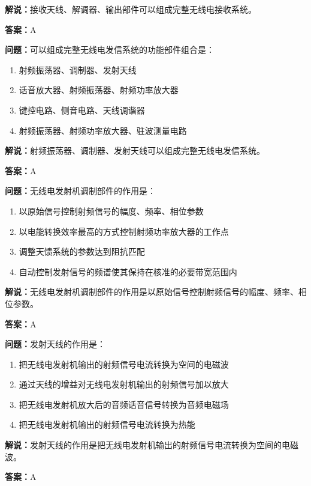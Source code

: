 \documentclass[UTF8]{ctexbook}
\begin{document}
\textbf{解说：}接收天线、解调器、输出部件可以组成完整无线电接收系统。%

\textbf{答案：}A

\textbf{问题：}可以组成完整无线电发信系统的功能部件组合是：

\begin{enumerate}[label=\Alph*), leftmargin=3em]
  \item 射频振荡器、调制器、发射天线
  \item 话音放大器、射频振荡器、射频功率放大器
  \item 键控电路、侧音电路、天线调谐器
  \item 射频振荡器、射频功率放大器、驻波测量电路
\end{enumerate}

\textbf{解说：}射频振荡器、调制器、发射天线可以组成完整无线电发信系统。%

\textbf{答案：}A

\textbf{问题：}无线电发射机调制部件的作用是：

\begin{enumerate}[label=\Alph*), leftmargin=3em]
  \item 以原始信号控制射频信号的幅度、频率、相位参数
  \item 以电能转换效率最高的方式控制射频功率放大器的工作点
  \item 调整天馈系统的参数达到阻抗匹配
  \item 自动控制发射信号的频谱使其保持在核准的必要带宽范围内
\end{enumerate}

\textbf{解说：}无线电发射机调制部件的作用是以原始信号控制射频信号的幅度、频率、相位参数。%

\textbf{答案：}A

\textbf{问题：}发射天线的作用是：

\begin{enumerate}[label=\Alph*), leftmargin=3em]
  \item 把无线电发射机输出的射频信号电流转换为空间的电磁波
  \item 通过天线的增益对无线电发射机输出的射频信号加以放大
  \item 把无线电发射机放大后的音频话音信号转换为音频电磁场
  \item 把无线电发射机输出的射频信号电流转换为热能
\end{enumerate}

\textbf{解说：}发射天线的作用是把无线电发射机输出的射频信号电流转换为空间的电磁波。%

\textbf{答案：}A
\end{document}
